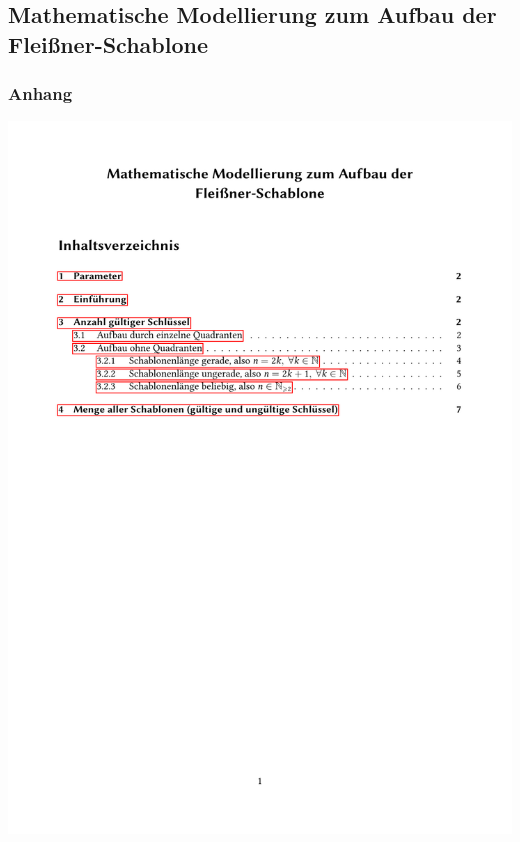 \documentclass{beamer}
\begin{document}
\subsection{Mathematische Modellierung zum Aufbau der Fleißner-Schablone}
\begin{frame}
\frametitle{Anhang}
\includegraphics[page=1, scale=0.4]{mathModell2.pdf}
\end{frame}
\end{document}
